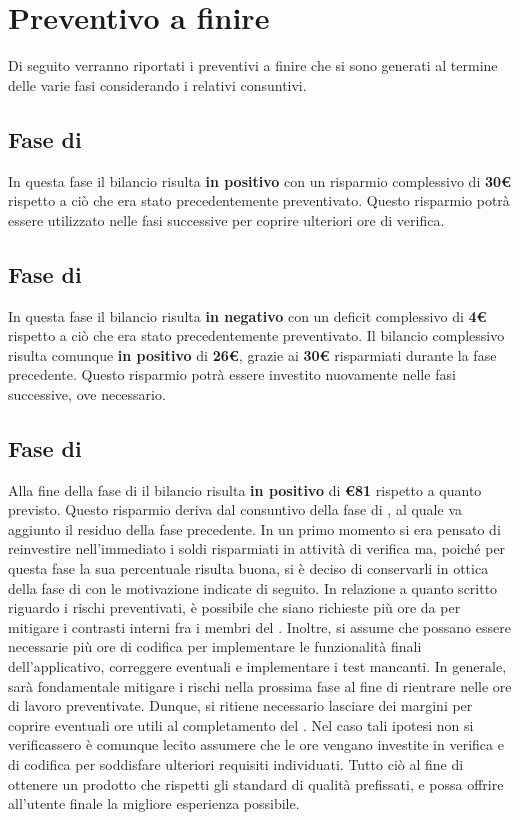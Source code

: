 \section{Preventivo a finire}\label{CaF}
Di seguito verranno riportati i preventivi a finire che si sono generati al termine delle varie fasi considerando i relativi consuntivi.
\subsection{Fase di \fPAt}
In questa fase il bilancio risulta \textbf{in positivo} con un risparmio complessivo di \textbf{30\euro} rispetto a ciò che era stato precedentemente preventivato. Questo risparmio potrà essere utilizzato nelle fasi successive per coprire ulteriori ore di verifica.
\subsection{Fase di \fPDt}
In questa fase il bilancio risulta \textbf{in negativo} con un deficit complessivo di \textbf{4\euro} rispetto a ciò che era stato precedentemente preventivato. Il bilancio complessivo risulta comunque \textbf{in positivo} di \textbf{26\euro}, grazie ai \textbf{30\euro} risparmiati durante la fase precedente. Questo risparmio potrà essere investito nuovamente nelle fasi successive, ove necessario.
\subsection{Fase di \fCt}
Alla fine della fase di \fC il bilancio risulta \textbf{in positivo} di \textbf{\euro81} rispetto a quanto previsto.
Questo risparmio deriva dal consuntivo della fase di \fC, al quale va aggiunto il residuo della fase precedente.
In un primo momento si era pensato di reinvestire nell'immediato i soldi risparmiati in attività di verifica ma, poiché per questa fase la sua percentuale risulta buona, si è deciso di conservarli in ottica della fase di \fVV con le motivazione indicate di seguito. \newline
In relazione a quanto scritto riguardo i rischi preventivati, è possibile che siano richieste più ore da \rRP per mitigare i contrasti interni fra i membri del .\newline
Inoltre, si assume che possano essere necessarie più ore di codifica per implementare le funzionalità finali dell'applicativo, correggere eventuali  e implementare i test mancanti.\newline
In generale, sarà fondamentale mitigare i rischi nella prossima fase al fine di rientrare nelle ore di lavoro preventivate.
Dunque, si ritiene necessario lasciare dei margini per coprire eventuali ore utili al completamento del .
Nel caso tali ipotesi non si verificassero è comunque lecito assumere che le ore vengano investite in verifica e di codifica per soddisfare ulteriori requisiti individuati. Tutto ciò al fine di ottenere un prodotto che rispetti gli standard di qualità prefissati, e possa offrire all'utente finale la migliore esperienza possibile.
